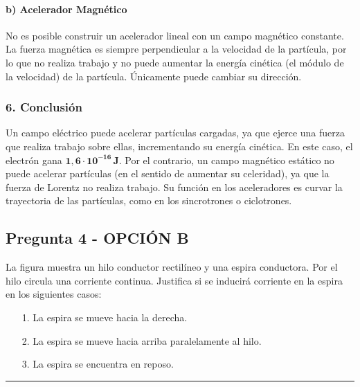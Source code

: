\paragraph*{b) Acelerador Magnético}
\begin{cajaresultado}
No es posible construir un acelerador lineal con un campo magnético constante. La fuerza magnética es siempre perpendicular a la velocidad de la partícula, por lo que no realiza trabajo y no puede aumentar la energía cinética (el módulo de la velocidad) de la partícula. Únicamente puede cambiar su dirección.
\end{cajaresultado}

\subsubsection*{6. Conclusión}
\begin{cajaconclusion}
Un campo eléctrico puede acelerar partículas cargadas, ya que ejerce una fuerza que realiza trabajo sobre ellas, incrementando su energía cinética. En este caso, el electrón gana $\mathbf{1,6 \cdot 10^{-16} \, J}$. Por el contrario, un campo magnético estático no puede acelerar partículas (en el sentido de aumentar su celeridad), ya que la fuerza de Lorentz no realiza trabajo. Su función en los aceleradores es curvar la trayectoria de las partículas, como en los sincrotrones o ciclotrones.
\end{cajaconclusion}

\newpage

\subsection{Pregunta 4 - OPCIÓN B}
\label{subsec:4B_2002_jun_ord}

\begin{cajaenunciado}
La figura muestra un hilo conductor rectilíneo y una espira conductora. Por el hilo circula una corriente continua. Justifica si se inducirá corriente en la espira en los siguientes casos:
\begin{enumerate}
    \item[1.] La espira se mueve hacia la derecha.
    \item[2.] La espira se mueve hacia arriba paralelamente al hilo.
    \item[3.] La espira se encuentra en reposo.
\end{enumerate}
\end{cajaenunciado}
\hrule

